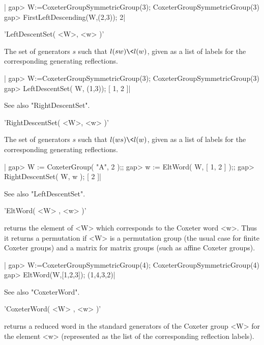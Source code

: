 |    gap> W:=CoxeterGroupSymmetricGroup(3);
    CoxeterGroupSymmetricGroup(3)
    gap> FirstLeftDescending(W,(2,3));
    2|


'LeftDescentSet( <W>, <w> )'

The set of generators $s$ such that $l(sw)\<l(w)$, given  as  a  list  of
labels for the corresponding generating reflections.

|    gap> W:=CoxeterGroupSymmetricGroup(3);
    CoxeterGroupSymmetricGroup(3)
    gap> LeftDescentSet( W, (1,3));
    [ 1, 2 ]|

See also "RightDescentSet".


'RightDescentSet( <W>, <w> )'

The set of generators $s$ such that $l(ws)\< l(w)$, given as  a  list  of
labels for the corresponding generating reflections.

|    gap> W := CoxeterGroup( "A", 2 );;
    gap> w := EltWord( W, [ 1, 2 ] );;
    gap> RightDescentSet( W, w );
    [ 2 ]|

See also "LeftDescentSet".



'EltWord( <W> , <w> )'

returns  the element of <W> which corresponds to the Coxeter word <w>. Thus
it  returns a permutation if <W> is a permutation group (the usual case for
finite  Coxeter  groups)  and  a  matrix  for matrix groups (such as affine
Coxeter  groups).

|    gap> W:=CoxeterGroupSymmetricGroup(4);
    CoxeterGroupSymmetricGroup(4)
    gap> EltWord(W,[1,2,3]);
    (1,4,3,2)|

See also "CoxeterWord".


'CoxeterWord( <W> , <w> )'

returns a reduced  word in the standard generators of  the Coxeter group
<W>  for  the  element  <w>  (represented as  the  {\GAP}  list  of  the
corresponding reflection labels).

